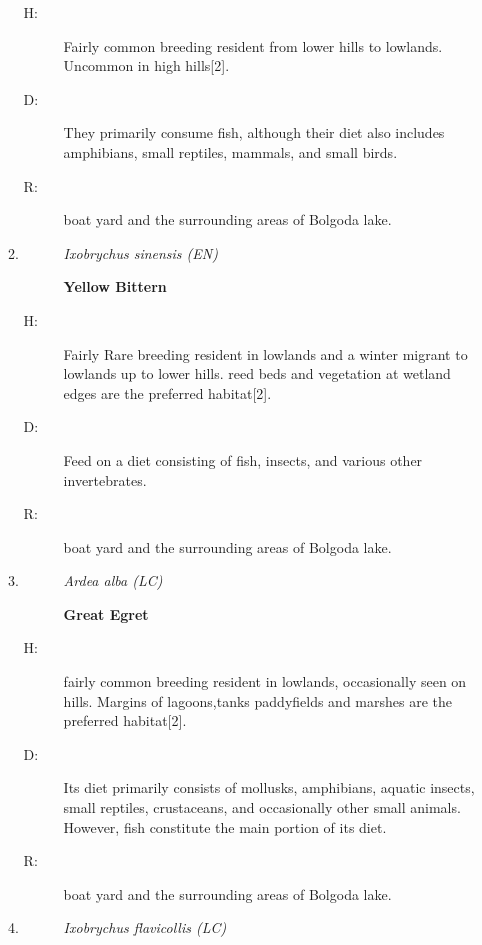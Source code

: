 \begin{itemize}
\begin{enumerate}
\begin{description}
\item[H: ]%
Fairly common breeding resident from lower hills to lowlands. Uncommon in high hills{[}2{]}.%
\item[D: ]%
They primarily consume fish, although their diet also includes amphibians, small reptiles, mammals, and small birds.%
\item[R: ]%
boat yard and the surrounding areas of Bolgoda lake.%
\end{description}%
\item%
\begin{description}%
\item[]%
\textit{Ixobrychus sinensis (EN)}%
\item[]%
\textbf{Yellow Bittern}%
\end{description}%
\begin{description}%
\item[H: ]%
Fairly Rare breeding resident in lowlands and a winter migrant to lowlands up to lower hills. reed beds and vegetation at wetland edges are the preferred habitat{[}2{]}.%
\item[D: ]%
Feed on a diet consisting of fish, insects, and various other invertebrates.%
\item[R: ]%
boat yard and the surrounding areas of Bolgoda lake.%
\end{description}%
\item%
\begin{description}%
\item[]%
\textit{Ardea alba (LC)}%
\item[]%
\textbf{Great Egret}%
\end{description}%
\begin{description}%
\item[H: ]%
fairly common breeding resident in lowlands, occasionally seen on hills. Margins of lagoons,tanks paddyfields and marshes are the preferred habitat{[}2{]}.%
\item[D: ]%
Its diet primarily consists of mollusks, amphibians, aquatic insects, small reptiles, crustaceans, and occasionally other small animals. However, fish constitute the main portion of its diet.%
\item[R: ]%
boat yard and the surrounding areas of Bolgoda lake.%
\end{description}%
\item%
\begin{description}%
\item[]%
\textit{Ixobrychus flavicollis (LC)}%
\item[]%

\end{description}
\end{enumerate}
\end{itemize}
